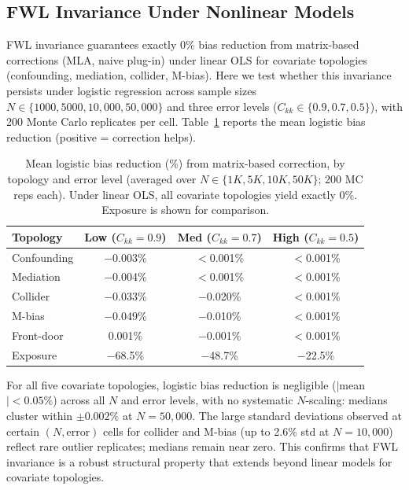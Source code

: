 \subsection{FWL Invariance Under Nonlinear Models}
\label{sec:fwl_nonlinear}

FWL invariance guarantees exactly 0\% bias reduction from matrix-based corrections (MLA, naive plug-in) under linear OLS for covariate topologies (confounding, mediation, collider, M-bias). Here we test whether this invariance persists under logistic regression across sample sizes $N \in \{1000, 5000, 10{,}000, 50{,}000\}$ and three error levels ($C_{kk} \in \{0.9, 0.7, 0.5\}$), with 200 Monte Carlo replicates per cell. Table~\ref{tab:fwl_nonlinear} reports the mean logistic bias reduction (positive = correction helps).

\begin{table}[h]
\centering
\small
\caption{Mean logistic bias reduction (\%) from matrix-based correction, by topology and error level (averaged over $N \in \{1K, 5K, 10K, 50K\}$; 200 MC reps each). Under linear OLS, all covariate topologies yield exactly 0\%. Exposure is shown for comparison.}
\label{tab:fwl_nonlinear}
\begin{tabular}{lccc}
\toprule
\textbf{Topology} & \textbf{Low} ($C_{kk}{=}0.9$) & \textbf{Med} ($C_{kk}{=}0.7$) & \textbf{High} ($C_{kk}{=}0.5$) \\
\midrule
Confounding & $-$0.003\% & $<$0.001\% & $<$0.001\% \\
Mediation & $-$0.004\% & $<$0.001\% & $<$0.001\% \\
Collider & $-$0.033\% & $-$0.020\% & $<$0.001\% \\
M-bias & $-$0.049\% & $-$0.010\% & $<$0.001\% \\
Front-door & 0.001\% & $-$0.001\% & $<$0.001\% \\
\midrule
Exposure & $-$68.5\% & $-$48.7\% & $-$22.5\% \\
\bottomrule
\end{tabular}
\end{table}

For all five covariate topologies, logistic bias reduction is negligible ($|$mean$| < 0.05\%$) across all $N$ and error levels, with no systematic $N$-scaling: medians cluster within $\pm 0.002\%$ at $N{=}50{,}000$. The large standard deviations observed at certain $(N, \text{error})$ cells for collider and M-bias (up to 2.6\% std at $N{=}10{,}000$) reflect rare outlier replicates; medians remain near zero. This confirms that FWL invariance is a robust structural property that extends beyond linear models for covariate topologies.

